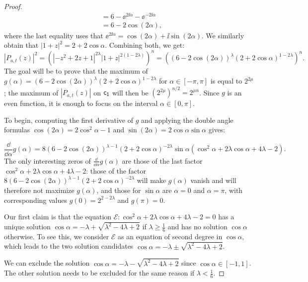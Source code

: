 \documentclass[11pt]{llncs}
\begin{document}
\begin{proof}
\begin{align*}
        &=6-\ee^{2\ii\alpha}-\ee^{-2\ii\alpha}\\
        &=6-2\cos (2\alpha),
    \end{align*}
    where the last equality uses that $\ee^{2\ii\alpha}=\cos(2\alpha)+\ii\sin(2\alpha)$. We similarly obtain that $|1+z|^2=2+2\cos\alpha$. Combining both, we get:   
    \[
        |P_{a,t}(z)|^2=\left(\left|-z^2+2z+1\right|^{2\lambda}|1+z|^{2(1-2\lambda)}\right)^n=\left((6-2\cos(2\alpha))^\lambda(2+2\cos\alpha)^{1-2\lambda}\right)^n.
    \]
    The goal will be to prove that the maximum of $g(\alpha)=(6-2\cos(2\alpha))^\lambda(2+2\cos\alpha)^{1-2\lambda}$ for $\alpha\in[-\pi,\pi]$ is equal to $2^{2\mu}$; the maximum of $|P_{a,t}(z)|$ on $\mathsf{c_1}$ will then be $\left(2^{2\mu}\right)^{n/2}=2^{\mu n}$. Since $g$ is an even function, it is enough to focus on the interval $\alpha\in[0,\pi]$.


    To begin, computing the first derivative of $g$ and applying the double angle formulas $\cos(2\alpha)=2\cos^2\alpha-1$ and $\sin(2\alpha)=2\cos\alpha\sin\alpha$ gives:
    

    \[
        \frac{\dd}{\dd\alpha}g(\alpha)=8(6-2\cos(2\alpha))^{\lambda-1}(2+2\cos\alpha)^{-2\lambda}\sin\alpha\left(\cos^2\alpha+2\lambda\cos\alpha+4\lambda-2\right).
    \]
    The only interesting zeros of $\frac{\dd}{\dd\alpha}g(\alpha)$ are those of the last factor 
    $\cos^2\alpha+2\lambda\cos\alpha+4\lambda-2$: those of the factor $8(6-2\cos(2\alpha))^{\lambda-1}(2+2\cos\alpha)^{-2\lambda}$ will make $g(\alpha)$ vanish and will therefore not maximize $g(\alpha)$, and those for $\sin\alpha$ are $\alpha=0$ and $\alpha=\pi$, with corresponding values $g(0)=2^{2-2\lambda}$ and $g(\pi)=0$.
    
    Our first claim is that the equation $\mathcal E:\cos^2\alpha+2\lambda\cos\alpha+4\lambda-2=0$ has a unique solution $\cos\alpha=-\lambda+\sqrt{\lambda^2-4\lambda+2}$ if $\lambda\geq\frac 16$ and has no solution $\cos\alpha$ otherwise. To see this, we consider $\mathcal E$ as an equation of second degree in $\cos\alpha$, which leads to the two solution candidates $\cos\alpha=-\lambda\pm\sqrt{\lambda^2-4\lambda+2}$. 
    
    
    
    
     
    We can exclude the solution $\cos\alpha=-\lambda-\sqrt{\lambda^2-4\lambda+2}$ since $\cos\alpha\in[-1,1]$. The other solution needs to be excluded for the same reason if $\lambda<\frac 16$.



\end{proof}
\end{document}
